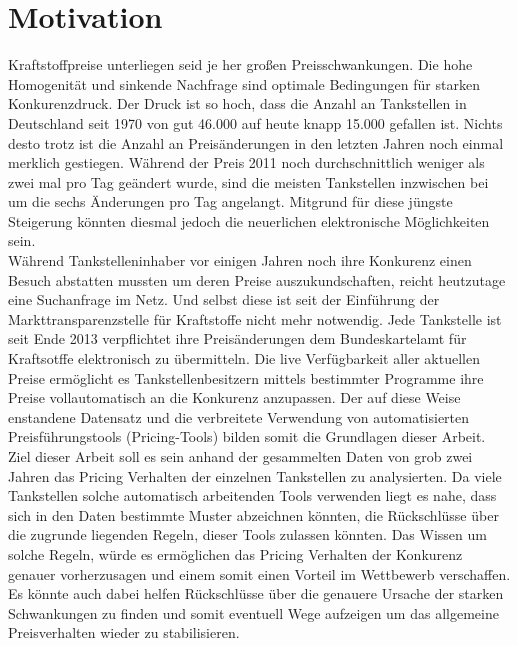 \documentclass[12pt,a4paper,bibliography=totocnumbered,listof=totocnumbered]{scrartcl}
\begin{document}
\setcounter{page}{1}
\onehalfspacing
{}
\section{Motivation}
Kraftstoffpreise unterliegen seid je her großen Preisschwankungen. Die hohe Homogenität und sinkende Nachfrage sind optimale Bedingungen für starken Konkurenzdruck. Der Druck ist so hoch, dass die Anzahl an Tankstellen in Deutschland seit 1970 von gut 46.000 auf heute knapp 15.000 gefallen ist.\cite{PraTa} Nichts desto trotz ist die Anzahl an Preisänderungen in den letzten Jahren noch einmal merklich gestiegen. Während der Preis 2011 noch durchschnittlich weniger als zwei mal pro Tag geändert wurde, sind die meisten Tankstellen inzwischen bei um die sechs Änderungen pro Tag angelangt.\cite{Unity} Mitgrund für diese jüngste Steigerung könnten diesmal jedoch die neuerlichen elektronische Möglichkeiten sein.\\

Während Tankstelleninhaber vor einigen Jahren noch ihre Konkurenz einen Besuch abstatten mussten um deren Preise auszukundschaften, reicht heutzutage eine Suchanfrage im Netz. Und selbst diese ist seit der Einführung der Markttransparenzstelle für Kraftstoffe nicht mehr notwendig. Jede Tankstelle ist seit Ende 2013 verpflichtet ihre Preisänderungen dem Bundeskartelamt für Kraftsotffe elektronisch zu übermitteln. Die live Verfügbarkeit aller aktuellen Preise ermöglicht es Tankstellenbesitzern mittels bestimmter Programme ihre Preise vollautomatisch an die Konkurenz anzupassen. Der auf diese Weise enstandene Datensatz und die verbreitete Verwendung von automatisierten Preisführungstools (Pricing-Tools) bilden somit die Grundlagen dieser Arbeit.\\

Ziel dieser Arbeit soll es sein anhand der gesammelten Daten von grob zwei Jahren das Pricing Verhalten der einzelnen Tankstellen zu analysierten. Da  viele Tankstellen solche automatisch arbeitenden Tools verwenden liegt es nahe, dass sich in den Daten bestimmte Muster abzeichnen könnten, die Rückschlüsse über die zugrunde liegenden Regeln, dieser Tools zulassen könnten. Das Wissen um solche Regeln, würde es ermöglichen das Pricing Verhalten der Konkurenz genauer vorherzusagen und einem somit einen Vorteil im Wettbewerb verschaffen. Es könnte auch dabei helfen Rückschlüsse über die genauere Ursache der starken Schwankungen zu finden und somit eventuell Wege  aufzeigen um das allgemeine Preisverhalten wieder zu stabilisieren. 
\newpage
\vspace{-1,2em}
\end{document}
